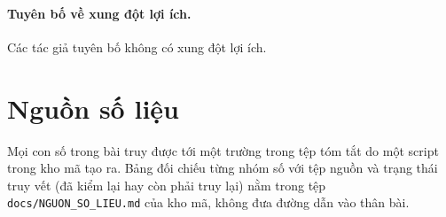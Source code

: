 \documentclass[a4paper,fleqn]{cas-dc}
\begin{document}
\paragraph{Tuyên bố về xung đột lợi ích.} Các tác giả tuyên bố không có xung đột lợi ích.

\appendix
\section{Nguồn số liệu}
\label{app:src}
Mọi con số trong bài truy được tới một trường trong tệp tóm tắt do một script trong kho mã tạo ra. Bảng đối chiếu từng nhóm số với tệp nguồn và trạng thái truy vết (đã kiểm lại hay còn phải truy lại) nằm trong tệp \texttt{docs/NGUON\_SO\_LIEU.md} của kho mã, không đưa đường dẫn vào thân bài.



\end{document}
